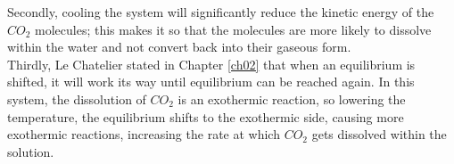 Secondly, cooling the system will significantly reduce the kinetic energy of the \begin{math}CO_{2}\end{math} molecules; this makes it so that the molecules are more likely to dissolve within the water and not convert back into their gaseous form. \\

Thirdly, Le Chatelier stated in Chapter \ref{ch02} that when an equilibrium is shifted, it will work its way until equilibrium can be reached again. 
In this system, the dissolution of \begin{math}CO_{2}\end{math} is an exothermic reaction, so lowering the temperature, the equilibrium shifts to the exothermic side, causing more exothermic reactions, increasing the rate at which \begin{math}CO_{2}\end{math} gets dissolved within the solution.
